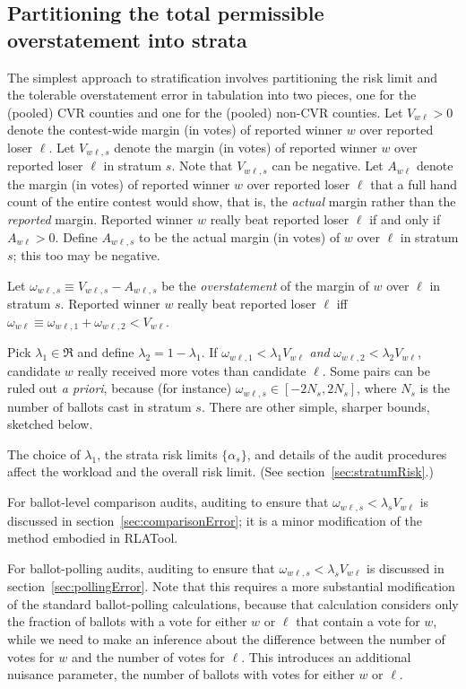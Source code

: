 \documentclass[12pt]{article}
\begin{document}
\subsection{Partitioning the total permissible overstatement into strata}
The simplest approach to stratification involves partitioning the risk limit and the tolerable
overstatement error in tabulation into
two pieces, one for the (pooled) CVR counties and one for the (pooled) non-CVR counties.
Let $V_{w\ell} > 0$ denote the contest-wide margin (in votes) of reported winner 
$w$ over reported loser
$\ell$.
Let $V_{w\ell,s}$ denote the margin (in votes) of reported winner $w$ over reported loser $\ell$
in stratum $s$. 
Note that $V_{w\ell,s}$ can be negative.
Let $A_{w\ell}$ denote the margin (in votes)
of reported winner $w$ over reported loser $\ell$ that 
a full hand count of the entire contest would show, that is, the \emph{actual} margin rather
than the \emph{reported} margin.
Reported winner $w$ really beat reported loser $\ell$ if and only if $A_{w\ell} > 0$.
Define $A_{w\ell,s}$ to be the actual margin (in votes) of $w$ over $\ell$ in stratum $s$;
this too may be negative.

Let $\omega_{w\ell,s} \equiv V_{w\ell,s} - A_{w\ell,s}$ be the \emph{overstatement}
of the margin of $w$ over $\ell$ in stratum $s$.
Reported winner $w$ really beat reported loser 
$\ell$ iff $\omega_{w\ell} \equiv \omega_{w\ell,1} + \omega_{w\ell,2} < V_{w\ell}$.

Pick $\lambda_1 \in \Re$ and define $\lambda_2 = 1-\lambda_1$.
If $\omega_{w\ell,1} < \lambda_1 V_{w\ell}$ \emph{and} 
$\omega_{w\ell,2} < \lambda_2 V_{w\ell}$, candidate $w$ really received more votes
than candidate $\ell$.
Some pairs can be ruled out \emph{a priori}, because (for instance) $\omega_{w\ell,s} \in [-2N_s, 2N_s]$,
where $N_s$ is the number of ballots cast in stratum $s$.
There are other simple, sharper bounds, sketched below.

The choice of $\lambda_1$, the strata risk limits $\{\alpha_s\}$, and details of the
audit procedures affect the workload and the overall risk limit.
(See section~\ref{sec:stratumRisk}.)

For ballot-level comparison audits, auditing to ensure that $\omega_{w\ell,s} < \lambda_s V_{w\ell}$
is discussed in section~\ref{sec:comparisonError}; it is a minor modification of the method
embodied in RLATool.

For ballot-polling audits, auditing to ensure that $\omega_{w\ell,s} < \lambda_s V_{w\ell}$ is discussed in section~\ref{sec:pollingError}.
Note that this requires a more substantial modification of the standard ballot-polling calculations,
because that calculation considers only the fraction of ballots with a vote for either 
$w$ or $\ell$ that contain a vote for $w$, while we need to make an inference about the 
difference between the number of votes for $w$ and the number of votes for $\ell$.
This introduces an additional nuisance parameter, the number of ballots with votes for either
$w$ or $\ell$.








\end{document}
